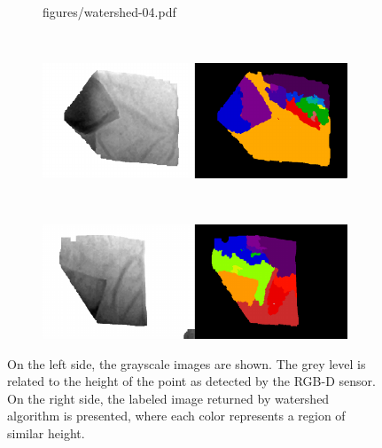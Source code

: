 \begin{figure}[htbp]
\begin{subfigure}[c]{0.7\textwidth}
    	{figures/watershed-04.pdf}
	\end{subfigure}
	~
	\begin{subfigure}[c]{0.7\textwidth}
	    \centering
    	\includegraphics[width=\textwidth]
    	{figures/watershed-05.pdf}
	\end{subfigure}
	~
    \begin{subfigure}[c]{0.7\textwidth}
	    \centering
    	\includegraphics[width=\textwidth]
    	{figures/watershed-06.pdf}
	\end{subfigure} 
    \caption{On the left side, the grayscale images are shown. The grey level is related to the height of the point as detected by the RGB-D sensor. On the right side, the labeled image returned by watershed algorithm is presented, where each color represents a region of similar height.}
    \label{fig:watershed_labels}
\end{figure}

